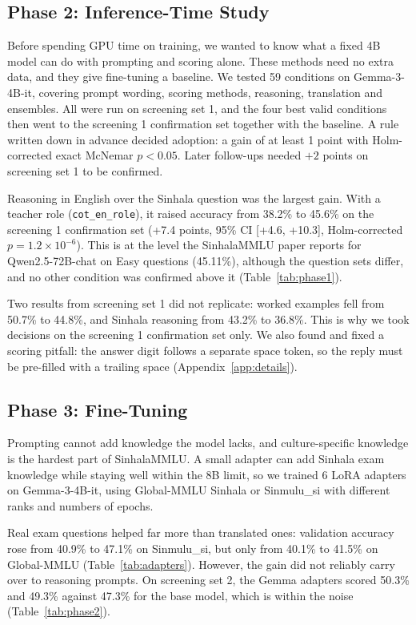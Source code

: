 \documentclass[11pt]{article}
\newcommand{\cond}[1]{\texttt{#1}}
\newcommand{\sinmulu}{Sinmulu\_si}
\begin{document}
\subsection{Phase 2: Inference-Time Study}\label{sec:phase2}\label{sec:prefill}
Before spending GPU time on training, we wanted to know what a fixed 4B model can do with prompting and scoring alone. These methods need no extra data, and they give fine-tuning a baseline. We tested 59 conditions on Gemma-3-4B-it, covering prompt wording, scoring methods, reasoning, translation and ensembles. All were run on screening set 1, and the four best valid conditions then went to the screening 1 confirmation set together with the baseline. A rule written down in advance decided adoption: a gain of at least 1 point with Holm-corrected exact McNemar $p<0.05$. Later follow-ups needed $+2$ points on screening set 1 to be confirmed.

Reasoning in English over the Sinhala question was the largest gain. With a teacher role (\cond{cot\_en\_role}), it raised accuracy from 38.2\% to 45.6\% on the screening 1 confirmation set (+7.4 points, 95\% CI [+4.6, +10.3], Holm-corrected $p = 1.2\times10^{-6}$). This is at the level the SinhalaMMLU paper reports for Qwen2.5-72B-chat on Easy questions (45.11\%), although the question sets differ, and no other condition was confirmed above it (Table~\ref{tab:phase1}).

Two results from screening set 1 did not replicate: worked examples fell from 50.7\% to 44.8\%, and Sinhala reasoning from 43.2\% to 36.8\%. This is why we took decisions on the screening 1 confirmation set only. We also found and fixed a scoring pitfall: the answer digit follows a separate space token, so the reply must be pre-filled with a trailing space (Appendix~\ref{app:details}).

\subsection{Phase 3: Fine-Tuning}\label{sec:phase3}
Prompting cannot add knowledge the model lacks, and culture-specific knowledge is the hardest part of SinhalaMMLU. A small adapter can add Sinhala exam knowledge while staying well within the 8B limit, so we trained 6 LoRA adapters on Gemma-3-4B-it, using Global-MMLU Sinhala or \sinmulu{} with different ranks and numbers of epochs.

Real exam questions helped far more than translated ones: validation accuracy rose from 40.9\% to 47.1\% on \sinmulu{}, but only from 40.1\% to 41.5\% on Global-MMLU (Table~\ref{tab:adapters}). However, the gain did not reliably carry over to reasoning prompts. On screening set 2, the Gemma adapters scored 50.3\% and 49.3\% against 47.3\% for the base model, which is within the noise (Table~\ref{tab:phase2}).
\end{document}
